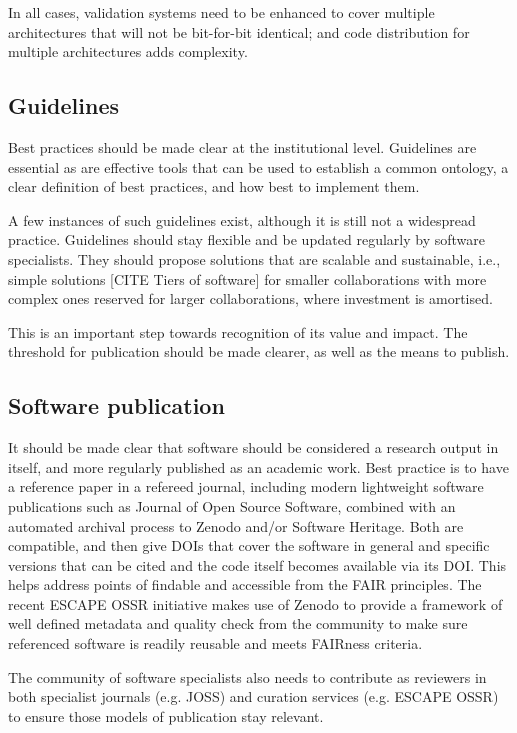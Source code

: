 In all cases, validation systems need to be enhanced to cover multiple architectures that will not be bit-for-bit identical; and code distribution for multiple architectures adds complexity.

\subsection{Guidelines}

Best practices should be made clear at the institutional level. Guidelines are essential as are effective tools that can be used to establish a common ontology, a clear definition of best practices, and how best to implement them. 

A few instances of such guidelines exist, although it is still not a widespread practice. Guidelines should stay flexible and be updated regularly by software specialists. They should propose solutions that are scalable and sustainable, i.e., simple solutions [CITE Tiers of software] for smaller collaborations with more complex ones reserved for larger collaborations, where investment is amortised.

This is an important step towards recognition of its value and impact. The threshold for publication should be made clearer, as well as the means to publish.


\subsection{Software publication}

It should be made clear that software should be considered a research output in itself, and more regularly published as an academic work. Best practice is to have a reference paper in a refereed journal, including modern lightweight software publications such as Journal of Open Source Software, combined with an automated archival process to Zenodo and/or Software Heritage. Both are compatible, and then give DOIs that cover the software in general and specific versions that can be cited and the code itself becomes available via its DOI. This helps address points of findable and accessible from the FAIR principles. The recent ESCAPE OSSR initiative makes use of Zenodo to provide a framework of well defined metadata and quality check from the community to make sure referenced software is readily reusable and meets FAIRness criteria.

The community of software specialists also needs to contribute as reviewers in both specialist journals (e.g. JOSS) and curation services (e.g. ESCAPE OSSR) to ensure those models of publication stay relevant.


